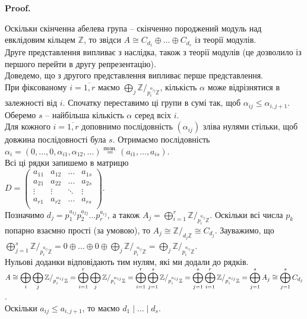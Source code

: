 \documentclass[a4paper, 10pt]{article}
\makeatletter
\theoremstyle{theoremdd}
\theoremstyle{theoremdd}
\theoremstyle{theoremdd}
\theoremstyle{theoremdd}
\theoremstyle{theoremdd}
\theoremstyle{theoremdd}
\theoremstyle{theoremdd}
\theoremstyle{theoremdd}
\theoremstyle{theoremdd}
\theoremstyle{theoremdd}
\theoremstyle{theoremdd}
\theoremstyle{theoremdd}
\theoremstyle{theoremdd}
\theoremstyle{theoremdd}
\theoremstyle{theoremdd}
\renewenvironment{proof}[1][Proof.\\]{\par
\pushQED{\hfill \qed}%
\normalfont \topsep6\p@\@plus6\p@\relax
\trivlist
\item\relax
{\bfseries
#1\@addpunct{.}}\hspace\labelsep\ignorespaces
}{%
\popQED\endtrivlist\@endpefalse
}
\makeatother
\begin{document}
\begin{proof}
Оскільки скінченна абелева група -- скінченно породжений модуль над евклідовим кільцем $\mathbb{Z}$, то звідси $A \cong C_{d_1} \oplus \dots \oplus C_{d_s}$ із теорії модулів.\\
Друге представлення випливає з наслідка, також з теорії модулів (це дозволило із першого перейти в другу репрезентацію).
\bigskip \\
Доведемо, що з другого представлення випливає перше представлення.\\
При фіксованому $i = \overline{1,r}$ маємо $\displaystyle\bigoplus_j \mathbb{Z}/_{p_i^{\alpha_{ij}} \mathbb{Z}}$, кількість $\alpha$ може відрізнятися в залежності від $i$. Спочатку переставимо ці групи в сумі так, щоб $\alpha_{ij} \leq \alpha_{i,j+1}$. Оберемо $s$ -- найбільша кількість $\alpha$ серед всіх $i$.\\
Для кожного $i = \overline{1,r}$ доповнимо послідовність $(\alpha_{ij})$ зліва нулями стільки, щоб довжина послідовності була $s$. Отримаємо послідовність $\alpha_i = (0,\dots,0,\alpha_{i1}, \alpha_{12}, \dots) \overset{\text{позн.}}{=} (a_{i1},\dots,a_{is})$. \\
Всі ці рядки запишемо в матрицю \\
$D = \begin{pmatrix}
a_{11} & a_{12} & \dots & a_{1s} \\
a_{21} & a_{22} & \dots & a_{2s} \\
\vdots & \vdots & \ddots & \vdots \\
a_{r1} & a_{r2} & \dots & a_{rs} \\
\end{pmatrix}$. \\
Позначимо $d_j = p_1^{a_{1j}} p_2^{a_{2j}} \dots p_r^{a_{rj}}$, а також $A_j = \displaystyle\bigoplus_{i=1}^r \mathbb{Z}/_{p_i^{a_{ij}} \mathbb{Z}}$. Оскільки всі числа $p_k$ попарно взаємно прості (за умовою), то $A_j \cong \mathbb{Z}/_{d_j \mathbb{Z}} \cong C_{d_j}$. Зауважимо, що\\
$\displaystyle\bigoplus_{j=1}^s \mathbb{Z}/_{p_i^{a_{ij}} \mathbb{Z}} = 0 \oplus \dots \oplus 0 \oplus \bigoplus_{j} \mathbb{Z}/_{p_i^{\alpha_{ij}} \mathbb{Z}} = \bigoplus_{j} \mathbb{Z}/_{p_i^{\alpha_{ij}} \mathbb{Z}}$.\\
Нульові доданки відповідають тим нулям, які ми додали до рядків.\\
$A \cong \displaystyle\bigoplus_i \bigoplus_{j} \mathbb{Z}/_{p_i^{\alpha_{ij}} \mathbb{Z}} = \displaystyle\bigoplus_{i=1}^r \bigoplus_{j} \mathbb{Z}/_{p_i^{\alpha_{ij}} \mathbb{Z}} = \bigoplus_{i=1}^r \bigoplus_{j=1}^s \mathbb{Z}/_{p_i^{a_{ij}} \mathbb{Z}} = \bigoplus_{j=1}^s \bigoplus_{i=1}^r \mathbb{Z}/_{p_i^{a_{ij}} \mathbb{Z}}  \\ = \bigoplus_{j=1}^s A_j \cong \bigoplus_{j=1}^s C_{d_j}$.\\
Оскільки $a_{ij} \leq a_{i,j+1}$, то маємо $d_1 \mid \dots \mid d_s$.
\end{proof}
\end{document}
